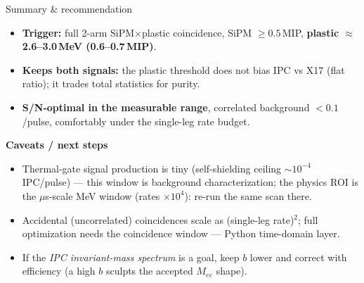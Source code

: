 \documentclass[aspectratio=169,10pt]{beamer}
\begin{document}
\begin{frame}{Summary \& recommendation}
\begin{itemize}
\item \textbf{Trigger:} full 2-arm SiPM$\times$plastic coincidence,
      SiPM $\geq0.5$\,MIP, \textbf{plastic $\approx$ 2.6--3.0\,MeV
      (0.6--0.7\,MIP)}.
\item \textbf{Keeps both signals:} the plastic threshold does not bias IPC vs
      X17 (flat ratio); it trades total statistics for purity.
\item \textbf{S/N-optimal in the measurable range}, correlated background
      $<0.1$/pulse, comfortably under the single-leg rate budget.
\end{itemize}
\vfill
\textbf{Caveats / next steps}
\begin{itemize}\small
\item Thermal-gate signal production is tiny (self-shielding ceiling
      $\sim10^{-4}$ IPC/pulse) --- this window is background characterization;
      the physics ROI is the $\mu$s-scale MeV window (rates $\times10^4$):
      re-run the same scan there.
\item Accidental (uncorrelated) coincidences scale as (single-leg rate)$^2$;
      full optimization needs the coincidence window --- Python time-domain layer.
\item If the \emph{IPC invariant-mass spectrum} is a goal, keep $b$ lower and
      correct with efficiency (a high $b$ sculpts the accepted $M_{ee}$ shape).
\end{itemize}
\end{frame}
\end{document}

